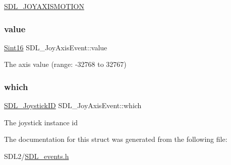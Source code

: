 \hyperlink{_s_d_l__events_8h_a3b589e89be6b35c02e0dd34a55f3fccaaf0803b3f8a12de3d85f81ebd7b514cd1}{S\+D\+L\+\_\+\+J\+O\+Y\+A\+X\+I\+S\+M\+O\+T\+I\+ON} \mbox{\label{struct_s_d_l___joy_axis_event_a53ee73e7c367934dd6edb69963be5556}} 
\subsubsection{\texorpdfstring{value}{value}}
{\footnotesize\ttfamily \hyperlink{_s_d_l__stdinc_8h_a9d0257032c0e146ab6121bf0122712f5}{Sint16} S\+D\+L\+\_\+\+Joy\+Axis\+Event\+::value}

The axis value (range\+: -\/32768 to 32767) \mbox{\label{struct_s_d_l___joy_axis_event_a965719f4703a7091bcc5f07f79fcf7e1}} 
\subsubsection{\texorpdfstring{which}{which}}
{\footnotesize\ttfamily \hyperlink{_s_d_l__joystick_8h_a3c3d32500cb08f76ee8077983912c0bd}{S\+D\+L\+\_\+\+Joystick\+ID} S\+D\+L\+\_\+\+Joy\+Axis\+Event\+::which}

The joystick instance id 

The documentation for this struct was generated from the following file\+:\begin{DoxyCompactItemize}
\item 
S\+D\+L2/\hyperlink{_s_d_l__events_8h}{S\+D\+L\+\_\+events.\+h}\end{DoxyCompactItemize}
